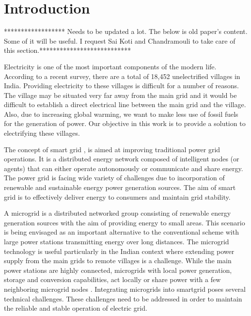 \section{Introduction}


****************** Needs to be updated a lot. The below is old paper's content. Some of it will be useful. I request Sai Koti and Chandramouli to take care of this section.***************************

Electricity is one of the most important components of the modern life. According to a recent survey, there are a total of 18,452 unelectrified villages in India. Providing electricity to these villages is difficult for a number of reasons. The village may be situated very far away from the main grid and it would be difficult to establish a direct electrical line between the main grid and the village. Also, due to increasing global warming, we want to make less use of fossil fuels for the generation of power. Our objective in this work is to provide a solution to electrifying these villages.

The concept of smart grid \cite{weiss1999multiagent}, is aimed at improving traditional power grid operations.  It is a distributed energy network composed of intelligent nodes (or agents) that can either operate autonomously or communicate and share energy. The  power grid is facing wide variety of challenges due to incorporation of renewable and sustainable energy power generation sources. The aim of smart grid is to effectively deliver energy to consumers and maintain grid stability.

A microgrid is a distributed networked group consisting of renewable energy generation sources with the aim of providing energy to small areas. This scenario is being envisaged as an important alternative to the conventional scheme with large power stations transmitting energy over long distances. The microgrid technology is useful particularly in the Indian context where extending power supply from the main grids to remote villages is a challenge. While the main power stations are highly connected, microgrids with local power generation, storage and conversion capabilities, act locally or share power with a few neighboring microgrid nodes \cite{farhangi2010path}.
Integrating microgrids into smartgrid poses several technical challenges. These challenges need to be addressed in order to maintain the reliable and stable operation of electric grid.

